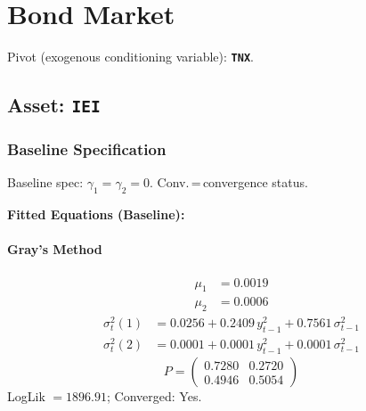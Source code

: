 \documentclass[11pt, a4paper]{article}
\begin{document}
\clearpage
\section{Bond Market}
\noindent Pivot (exogenous conditioning variable): \textbf{\texttt{TNX}}.

\subsection{Asset: \texttt{IEI}}
\subsubsection*{Baseline Specification}
\begin{table}[H]
\centering\scriptsize
\caption{IEI --- Baseline Specification}
\label{tab:iei_baseline}
\smallskip
\begin{flushleft}\scriptsize Baseline spec: $\gamma_1 = \gamma_2 = 0$. Conv.\,=\,convergence status.\end{flushleft}
\end{table}

\medskip
\noindent\textbf{Fitted Equations (Baseline):}
\paragraph{Gray's Method}
\begin{align}
\mu_{1} &= 0.0019 \\
\mu_{2} &= 0.0006
\end{align}
\begin{align}
\sigma^2_{t}(1) &= 0.0256 + 0.2409\, y_{t-1}^2 + 0.7561\, \sigma^2_{t-1} \\
\sigma^2_{t}(2) &= 0.0001 + 0.0001\, y_{t-1}^2 + 0.0001\, \sigma^2_{t-1}
\end{align}
\begin{equation}
P = \begin{pmatrix} 0.7280 & 0.2720 \\ 0.4946 & 0.5054 \end{pmatrix}
\end{equation}
LogLik $= 1896.91$; Converged: Yes.
\end{document}
